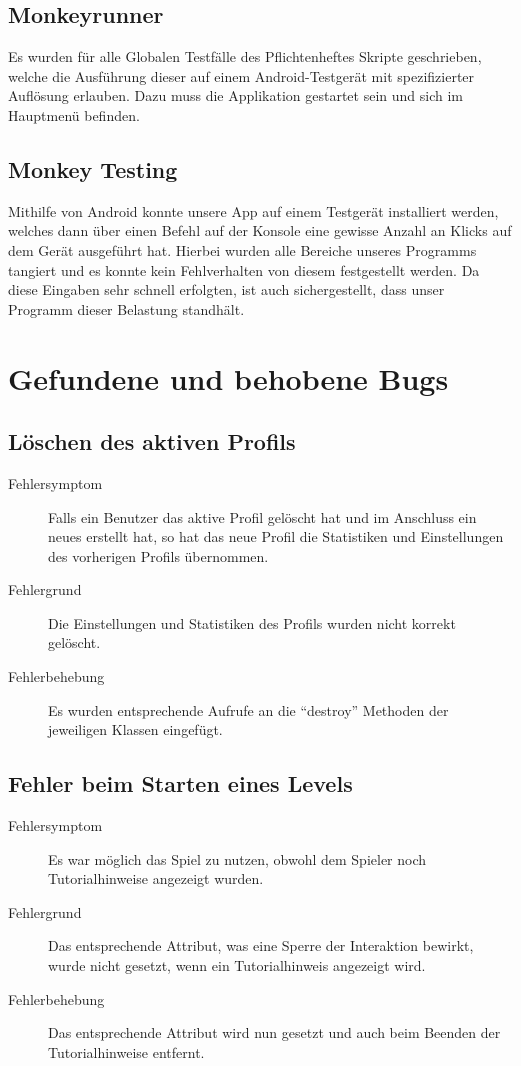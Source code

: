 \documentclass[parskip=full]{scrreprt}
\begin{document}
\section{Monkeyrunner}

Es wurden für alle Globalen Testfälle des Pflichtenheftes Skripte geschrieben, welche die Ausführung dieser auf einem Android-Testgerät mit spezifizierter Auflösung erlauben. Dazu muss die Applikation gestartet sein und sich im Hauptmenü befinden.

\section{Monkey Testing}

Mithilfe von Android konnte unsere App auf einem Testgerät installiert werden, welches dann über einen Befehl auf der Konsole eine gewisse Anzahl an Klicks auf dem Gerät ausgeführt hat. Hierbei wurden alle Bereiche unseres Programms tangiert und es konnte kein Fehlverhalten von diesem festgestellt werden. Da diese Eingaben sehr schnell erfolgten, ist auch sichergestellt, dass unser Programm dieser Belastung standhält.

\chapter{Gefundene und behobene Bugs}

\section{Löschen des aktiven Profils}
\begin{description}
	\item[Fehlersymptom] Falls ein Benutzer das aktive Profil gelöscht hat und im Anschluss ein neues erstellt hat, so hat das neue Profil die Statistiken und Einstellungen des vorherigen Profils übernommen.
	\item[Fehlergrund] Die Einstellungen und Statistiken des Profils wurden nicht korrekt gelöscht.
	\item[Fehlerbehebung] Es wurden entsprechende Aufrufe an die \enquote{destroy} Methoden der jeweiligen Klassen eingefügt.
\end{description}

\section{Fehler beim Starten eines Levels}
\begin{description}
	\item[Fehlersymptom] Es war möglich das Spiel zu nutzen, obwohl dem Spieler noch Tutorialhinweise angezeigt wurden.
	\item[Fehlergrund] Das entsprechende Attribut, was eine Sperre der Interaktion bewirkt, wurde nicht gesetzt, wenn ein Tutorialhinweis angezeigt wird.
	\item[Fehlerbehebung] Das entsprechende Attribut wird nun gesetzt und auch beim Beenden der Tutorialhinweise entfernt.
\end{description}
\end{document}
